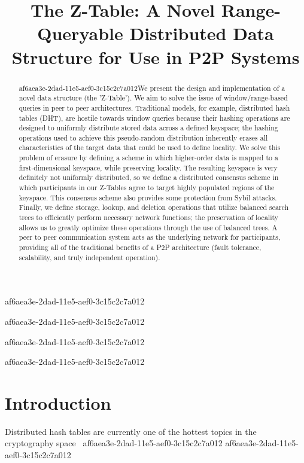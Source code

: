 \documentclass[12pt]{article}
\title{The Z-Table: A Novel Range-Queryable Distributed Data Structure for Use in P2P Systems}
\begin{document}
af6aea3e-2dad-11e5-aef0-3c15c2c7a012
\maketitle

af6aea3e-2dad-11e5-aef0-3c15c2c7a012\begin{abstract}
af6aea3e-2dad-11e5-aef0-3c15c2c7a012We present the design and implementation of a novel data structure (the 'Z-Table'). We aim to solve the issue of window/range-based queries in peer to peer architectures. Traditional models, for example,  distributed hash tables (DHT), are hostile towards window queries because their hashing operations are designed to uniformly distribute stored data across a defined keyspace; the hashing operations used to achieve this pseudo-random distribution inherently erases all characteristics of the target data that could be used to define locality. We solve this problem of erasure by defining a scheme in which higher-order data is mapped to a first-dimensional keyspace, while preserving locality. The resulting keyspace is very definitely not uniformly distributed, so we define a distributed consensus scheme in which participants in our Z-Tables agree to target highly populated regions of the keyspace. This consensus scheme also provides some protection from Sybil attacks. Finally, we define storage, lookup, and deletion operations that utilize balanced search trees to efficiently perform necessary network functions; the preservation of locality allows us to greatly optimize these operations through the use of balanced trees. A peer to peer communication system acts as the underlying network for participants, providing all of the traditional benefits of a P2P architecture (fault tolerance, scalability, and truly independent operation).
\end{abstract}
af6aea3e-2dad-11e5-aef0-3c15c2c7a012

af6aea3e-2dad-11e5-aef0-3c15c2c7a012\newpage
\section{Introduction}
Distributed hash tables are currently one of the hottest topics in the cryptography space~\cite{Stoica:2001dj,Rowstron:2001ea,Ratnasamy:2001wn}
af6aea3e-2dad-11e5-aef0-3c15c2c7a012
\printbibliography
af6aea3e-2dad-11e5-aef0-3c15c2c7a012
\end{document}
